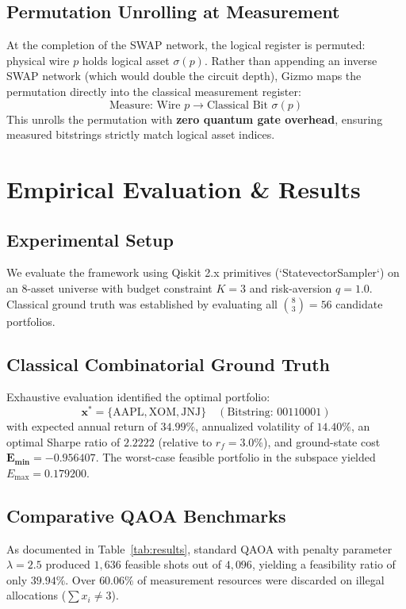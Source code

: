 \documentclass[10pt,twocolumn]{article}
\begin{document}
\subsection{Permutation Unrolling at Measurement}
At the completion of the SWAP network, the logical register is permuted: physical wire $p$ holds logical asset $\sigma(p)$. Rather than appending an inverse SWAP network (which would double the circuit depth), Gizmo maps the permutation directly into the classical measurement register:
\begin{equation}
\text{Measure: Wire } p \longrightarrow \text{Classical Bit } \sigma(p)
\end{equation}
This unrolls the permutation with \textbf{zero quantum gate overhead}, ensuring measured bitstrings strictly match logical asset indices.

\section{Empirical Evaluation \& Results}

\subsection{Experimental Setup}
We evaluate the framework using Qiskit 2.x primitives (`StatevectorSampler`) on an 8-asset universe with budget constraint $K=3$ and risk-aversion $q=1.0$. Classical ground truth was established by evaluating all $\binom{8}{3} = 56$ candidate portfolios.

\subsection{Classical Combinatorial Ground Truth}
Exhaustive evaluation identified the optimal portfolio:
\begin{equation}
\mathbf{x}^* = \{\text{AAPL}, \text{XOM}, \text{JNJ}\} \quad (\text{Bitstring: } 00110001)
\end{equation}
with expected annual return of $\mathbf{34.99\%}$, annualized volatility of $\mathbf{14.40\%}$, an optimal Sharpe ratio of $\mathbf{2.2222}$ (relative to $r_f = 3.0\%$), and ground-state cost $\mathbf{E_{\min} = -0.956407}$. The worst-case feasible portfolio in the subspace yielded $E_{\max} = 0.179200$.

\subsection{Comparative QAOA Benchmarks}
As documented in Table~\ref{tab:results}, standard QAOA with penalty parameter $\lambda = 2.5$ produced $1,636$ feasible shots out of $4,096$, yielding a feasibility ratio of only $\mathbf{39.94\%}$. Over $\mathbf{60.06\%}$ of measurement resources were discarded on illegal allocations ($\sum x_i \neq 3$).
\end{document}
